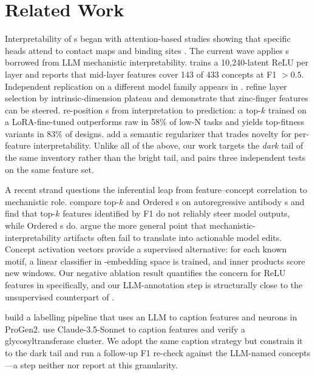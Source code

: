 \section{Related Work}
\label{sec:related}

 Interpretability of \plm{}s began with attention-based studies showing that specific heads attend to contact maps and binding sites \citep{vig2020bertology, stark2023insights}. The current wave applies \sae{}s borrowed from LLM mechanistic interpretability. \interplm \citep{simon2024interplm} trains a 10{,}240-latent ReLU \sae per \esm layer and reports that mid-layer features cover 143 of 433 \swissprot concepts at F1 $> 0.5$. Independent replication on a different model family appears in \citet{adams2025sae}. \citet{villegas2025steering} refine layer selection by intrinsic-dimension plateau and demonstrate that zinc-finger features can be steered. \citet{tsui2025lownsae} re-position \sae{}s from interpretation to prediction: a top-$k$ \sae trained on a LoRA-fine-tuned \esmlarge outperforms raw \esm in 58\% of \proteingym low-N tasks and yields top-fitness variants in 83\% of designs. \citet{protsae2025} add a semantic regularizer that trades novelty for per-feature interpretability. Unlike all of the above, our work targets the \emph{dark} tail of the same \sae inventory rather than the bright tail, and pairs three independent tests on the same feature set.

 A recent strand questions the inferential leap from feature--concept correlation to mechanistic role. \citet{haque2026antibody} compare top-$k$ and Ordered \sae{}s on autoregressive antibody \plm{}s and find that top-$k$ features identified by F1 do not reliably steer model outputs, while Ordered \sae{}s do. \citet{bricken2026actionability} argue the more general point that mechanistic-interpretability artifacts often fail to translate into actionable model edits. Concept activation vectors \citep{shamail2025cav} provide a supervised alternative: for each known motif, a linear classifier in \plm-embedding space is trained, and inner products score new windows. Our negative ablation result quantifies the \citet{haque2026antibody, bricken2026actionability} concern for ReLU \sae features in \esm specifically, and our LLM-annotation step is structurally close to the unsupervised counterpart of \citet{shamail2025cav}.

 \citet{parsan2025labelling} build a labelling pipeline that uses an LLM to caption \sae features and \plm neurons in ProGen2. \citet{simon2024interplm} use Claude-3.5-Sonnet to caption features and verify a glycosyltransferase cluster. We adopt the same caption strategy but constrain it to the dark tail and run a follow-up F1 re-check against the LLM-named concepts---a step neither \citet{simon2024interplm} nor \citet{parsan2025labelling} report at this granularity.

